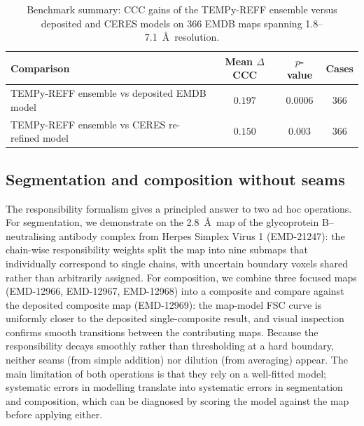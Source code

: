 \documentclass[11pt]{article}
\begin{document}
\begin{table}[t]
  \centering
  \caption{Benchmark summary: CCC gains of the TEMPy-REFF ensemble versus deposited and CERES models on 366 EMDB maps spanning 1.8--7.1~\AA\ resolution.}
  \label{tab:ccc}
  \begin{tabular}{lccc}
    \toprule
    Comparison & Mean $\Delta$CCC & $p$-value & Cases \\
    \midrule
    TEMPy-REFF ensemble vs deposited EMDB model & $0.197$ & $0.0006$ & $366$ \\
    TEMPy-REFF ensemble vs CERES re-refined model & $0.150$ & $0.003$ & $366$ \\
    \bottomrule
  \end{tabular}
\end{table}

\subsection{Segmentation and composition without seams}
The responsibility formalism gives a principled answer to two ad hoc operations. For segmentation, we demonstrate on the 2.8~\AA\ map of the glycoprotein B--neutralising antibody complex from Herpes Simplex Virus 1 (EMD-21247): the chain-wise responsibility weights split the map into nine submaps that individually correspond to single chains, with uncertain boundary voxels shared rather than arbitrarily assigned. For composition, we combine three focused maps (EMD-12966, EMD-12967, EMD-12968) into a composite and compare against the deposited composite map (EMD-12969): the map-model FSC curve is uniformly closer to the deposited single-composite result, and visual inspection confirms smooth transitions between the contributing maps. Because the responsibility decays smoothly rather than thresholding at a hard boundary, neither seams (from simple addition) nor dilution (from averaging) appear. The main limitation of both operations is that they rely on a well-fitted model; systematic errors in modelling translate into systematic errors in segmentation and composition, which can be diagnosed by scoring the model against the map before applying either.
\end{document}
